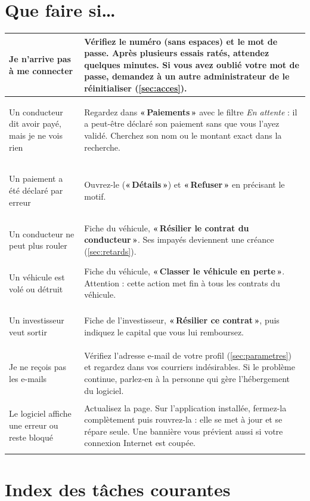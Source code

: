 \documentclass[11pt,a4paper]{article}
\newcommand{\bouton}[1]{\textbf{«\,#1\,»}}
\let\oldsection\section
\renewcommand{\section}{\clearpage\oldsection}
\begin{document}
\section{Que faire si\ldots}

\begin{center}
\begin{tabularx}{\linewidth}{@{}>{\bfseries\raggedright}p{4.4cm}X@{}}
\toprule
Je n'arrive pas à me connecter & Vérifiez le numéro (sans espaces) et le mot de passe. Après plusieurs essais ratés, attendez quelques minutes. Si vous avez oublié votre mot de passe, demandez à un autre administrateur de le réinitialiser (\autoref{sec:acces}).\\
\midrule
Un conducteur dit avoir payé, mais je ne vois rien & Regardez dans \bouton{Paiements} avec le filtre \textit{En attente} : il a peut-être déclaré son paiement sans que vous l'ayez validé. Cherchez son nom ou le montant exact dans la recherche.\\
\midrule
Un paiement a été déclaré par erreur & Ouvrez-le (\bouton{Détails}) et \bouton{Refuser} en précisant le motif.\\
\midrule
Un conducteur ne peut plus rouler & Fiche du véhicule, \bouton{Résilier le contrat du conducteur}. Ses impayés deviennent une créance (\autoref{sec:retards}).\\
\midrule
Un véhicule est volé ou détruit & Fiche du véhicule, \bouton{Classer le véhicule en perte}. Attention : cette action met fin à tous les contrats du véhicule.\\
\midrule
Un investisseur veut sortir & Fiche de l'investisseur, \bouton{Résilier ce contrat}, puis indiquez le capital que vous lui remboursez.\\
\midrule
Je ne reçois pas les e-mails & Vérifiez l'adresse e-mail de votre profil (\autoref{sec:parametres}) et regardez dans vos courriers indésirables. Si le problème continue, parlez-en à la personne qui gère l'hébergement du logiciel.\\
\midrule
Le logiciel affiche une erreur ou reste bloqué & Actualisez la page. Sur l'application installée, fermez-la complètement puis rouvrez-la : elle se met à jour et se répare seule. Une bannière vous prévient aussi si votre connexion Internet est coupée.\\
\bottomrule
\end{tabularx}
\end{center}

\section{Index des tâches courantes}\label{sec:taches}
\end{document}
